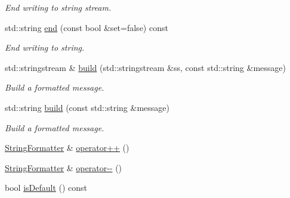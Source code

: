 \begin{DoxyCompactItemize}
\begin{DoxyCompactList}\small\item\em End writing to string stream. \end{DoxyCompactList}\item 
std\+::string \hyperlink{classStringFormatter_ae06dd9b27922820923fa323702f4111c}{end} (const bool \&set=false) const
\begin{DoxyCompactList}\small\item\em End writing to string. \end{DoxyCompactList}\item 
std\+::stringstream \& \hyperlink{classStringFormatter_af7fd3924f4db714c3b278ffa3c26a872}{build} (std\+::stringstream \&ss, const std\+::string \&message)
\begin{DoxyCompactList}\small\item\em Build a formatted message. \end{DoxyCompactList}\item 
std\+::string \hyperlink{classStringFormatter_a49080dfd01d9fbca9efab8a8a955ab76}{build} (const std\+::string \&message)
\begin{DoxyCompactList}\small\item\em Build a formatted message. \end{DoxyCompactList}\item 
\hyperlink{classStringFormatter}{String\+Formatter} \& \hyperlink{classStringFormatter_ae5e113c66eac2e99743eb3ce75bb9b12}{operator++} ()
\item 
\hyperlink{classStringFormatter}{String\+Formatter} \& \hyperlink{classStringFormatter_adb0e8aad266a4a8f68a6ff6db7dbe231}{operator-\/-\/} ()
\item 
bool \hyperlink{classStringFormatter_ad5c79478047b44b242bcd5e3b64df3b6}{is\+Default} () const
\end{DoxyCompactItemize}
